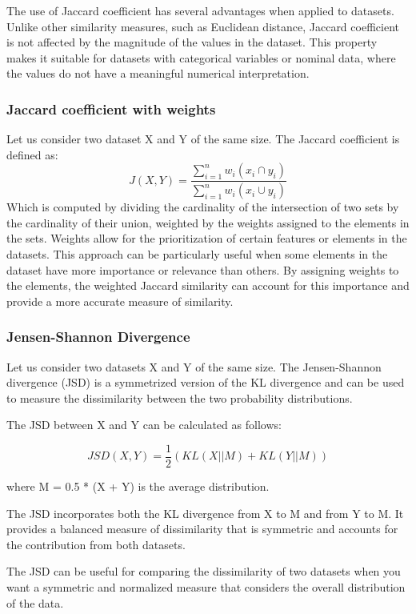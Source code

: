 The use of Jaccard coefficient has several advantages when applied to datasets.
Unlike other similarity measures, such as Euclidean distance, Jaccard coefficient is not affected by the magnitude of the values in the dataset.
This property makes it suitable for datasets with categorical variables or nominal data, where the values do not have a meaningful numerical interpretation.

\subsubsection{Jaccard coefficient with weights} Let us consider two dataset X and Y of the same size.
The Jaccard coefficient is defined as:\[J(X,Y) = \frac{\sum_{i=1}^{n}w_i(x_i \cap y_i)}{\sum_{i=1}^{n}w_i(x_i \cup y_i)}\]
Which is computed by dividing the cardinality of the intersection of two sets by the cardinality of their union, weighted by the weights assigned to the elements in the sets.
Weights allow for the prioritization of certain features or elements in the datasets.
This approach can be particularly useful when some elements in the dataset have more importance or relevance than others.
By assigning weights to the elements, the weighted Jaccard similarity can account for this importance and provide a more accurate measure of similarity.

\subsubsection{Jensen-Shannon Divergence}

Let us consider two datasets X and Y of the same size. The Jensen-Shannon divergence (JSD) is a symmetrized version of the KL divergence and can be used to measure the dissimilarity between the two probability distributions.

The JSD between X and Y can be calculated as follows:

\[JSD(X, Y) = \frac{1}{2} \left( KL(X || M)
  + KL(Y || M) \right)\]

where M = 0.5 * (X + Y) is the average distribution.

The JSD incorporates both the KL divergence from X to M and from Y to M. It provides a balanced measure of dissimilarity that is symmetric and accounts for the contribution from both datasets.

The JSD can be useful for comparing the dissimilarity of two datasets when you want a symmetric and normalized measure that considers the overall distribution of the data.

